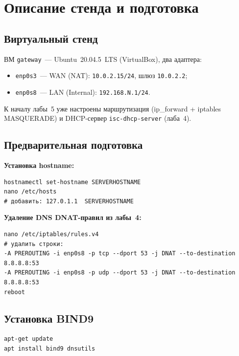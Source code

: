 \section{Описание стенда и подготовка}

\subsection{Виртуальный стенд}

ВМ \texttt{gateway}~--- Ubuntu~20.04.5~LTS (VirtualBox), два адаптера:
\begin{itemize}
  \item \texttt{enp0s3}~--- WAN (NAT): \texttt{10.0.2.15/24}, шлюз \texttt{10.0.2.2};
  \item \texttt{enp0s8}~--- LAN (Internal): \texttt{192.168.N.1/24}.
\end{itemize}

К началу лабы~5 уже настроены маршрутизация (ip\_forward + iptables MASQUERADE) и DHCP-сервер \texttt{isc-dhcp-server} (лаба~4).

\subsection{Предварительная подготовка}

\textbf{Установка hostname:}
\begin{lstlisting}
hostnamectl set-hostname SERVERHOSTNAME
nano /etc/hosts
# добавить: 127.0.1.1  SERVERHOSTNAME
\end{lstlisting}

\textbf{Удаление DNS DNAT-правил из лабы~4:}
\begin{lstlisting}
nano /etc/iptables/rules.v4
# удалить строки:
-A PREROUTING -i enp0s8 -p tcp --dport 53 -j DNAT --to-destination 8.8.8.8:53
-A PREROUTING -i enp0s8 -p udp --dport 53 -j DNAT --to-destination 8.8.8.8:53
reboot
\end{lstlisting}

\subsection{Установка BIND9}
\begin{lstlisting}
apt-get update
apt install bind9 dnsutils
\end{lstlisting}
